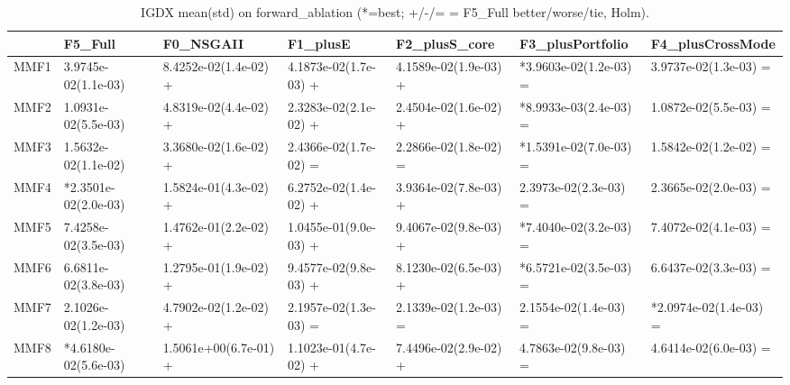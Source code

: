 \begin{table}[t]
\centering
\caption{IGDX mean(std) on forward_ablation (*=best; +/-/= = F5_Full better/worse/tie, Holm).}
\label{tab:forward_ablation_IGDX}
\begin{tabular}{lllllll}
\toprule
 & F5\_Full & F0\_NSGAII & F1\_plusE & F2\_plusS\_core & F3\_plusPortfolio & F4\_plusCrossMode \\
\midrule
MMF1 & 3.9745e-02(1.1e-03) & 8.4252e-02(1.4e-02) + & 4.1873e-02(1.7e-03) + & 4.1589e-02(1.9e-03) + & *3.9603e-02(1.2e-03) = & 3.9737e-02(1.3e-03) = \\
MMF2 & 1.0931e-02(5.5e-03) & 4.8319e-02(4.4e-02) + & 2.3283e-02(2.1e-02) + & 2.4504e-02(1.6e-02) + & *8.9933e-03(2.4e-03) = & 1.0872e-02(5.5e-03) = \\
MMF3 & 1.5632e-02(1.1e-02) & 3.3680e-02(1.6e-02) + & 2.4366e-02(1.7e-02) = & 2.2866e-02(1.8e-02) = & *1.5391e-02(7.0e-03) = & 1.5842e-02(1.2e-02) = \\
MMF4 & *2.3501e-02(2.0e-03) & 1.5824e-01(4.3e-02) + & 6.2752e-02(1.4e-02) + & 3.9364e-02(7.8e-03) + & 2.3973e-02(2.3e-03) = & 2.3665e-02(2.0e-03) = \\
MMF5 & 7.4258e-02(3.5e-03) & 1.4762e-01(2.2e-02) + & 1.0455e-01(9.0e-03) + & 9.4067e-02(9.8e-03) + & *7.4040e-02(3.2e-03) = & 7.4072e-02(4.1e-03) = \\
MMF6 & 6.6811e-02(3.8e-03) & 1.2795e-01(1.9e-02) + & 9.4577e-02(9.8e-03) + & 8.1230e-02(6.5e-03) + & *6.5721e-02(3.5e-03) = & 6.6437e-02(3.3e-03) = \\
MMF7 & 2.1026e-02(1.2e-03) & 4.7902e-02(1.2e-02) + & 2.1957e-02(1.3e-03) = & 2.1339e-02(1.2e-03) = & 2.1554e-02(1.4e-03) = & *2.0974e-02(1.4e-03) = \\
MMF8 & *4.6180e-02(5.6e-03) & 1.5061e+00(6.7e-01) + & 1.1023e-01(4.7e-02) + & 7.4496e-02(2.9e-02) + & 4.7863e-02(9.8e-03) = & 4.6414e-02(6.0e-03) = \\
\bottomrule
\end{tabular}
\end{table}
